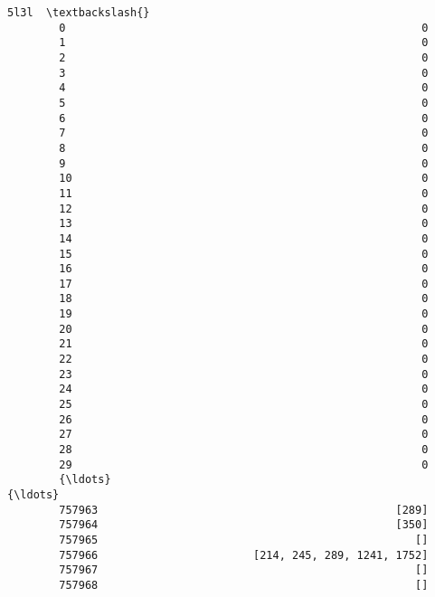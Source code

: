 \documentclass[11pt]{article}
\begin{document}
\begin{Verbatim}[commandchars=\\\{\}]
                                                             5l3l  \textbackslash{}
        0                                                       0   
        1                                                       0   
        2                                                       0   
        3                                                       0   
        4                                                       0   
        5                                                       0   
        6                                                       0   
        7                                                       0   
        8                                                       0   
        9                                                       0   
        10                                                      0   
        11                                                      0   
        12                                                      0   
        13                                                      0   
        14                                                      0   
        15                                                      0   
        16                                                      0   
        17                                                      0   
        18                                                      0   
        19                                                      0   
        20                                                      0   
        21                                                      0   
        22                                                      0   
        23                                                      0   
        24                                                      0   
        25                                                      0   
        26                                                      0   
        27                                                      0   
        28                                                      0   
        29                                                      0   
        {\ldots}                                                   {\ldots}   
        757963                                              [289]   
        757964                                              [350]   
        757965                                                 []   
        757966                        [214, 245, 289, 1241, 1752]   
        757967                                                 []   
        757968                                                 []   

\end{Verbatim}
\end{document}
